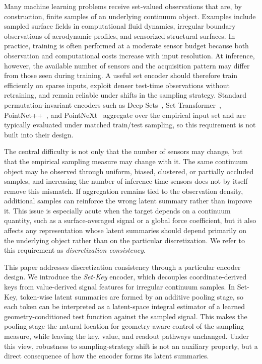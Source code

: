 \documentclass[11pt]{article}
\begin{document}
Many machine learning problems receive set-valued observations that are, by
construction, finite samples of an underlying continuum object.  Examples
include sampled surface fields in computational fluid dynamics, irregular
boundary observations of aerodynamic profiles, and sensorized structural
surfaces.  In practice, training is often performed at a moderate sensor budget
because both observation and computational costs increase with input
resolution.  At
inference, however, the available number of sensors and the acquisition pattern
may differ from those seen during training.  A useful set encoder should
therefore train efficiently on sparse inputs, exploit denser test-time
observations without retraining, and remain reliable under shifts in the
sampling strategy.  Standard permutation-invariant encoders such as Deep
Sets~\cite{zaheer2017deep}, Set Transformer~\cite{lee2019set}, PointNet++~\cite{qi2017pointnetpp},
and PointNeXt~\cite{qian2022pointnext} aggregate over the empirical input set
and are typically evaluated under matched train/test sampling, so this
requirement is not built into their design.

The central difficulty is not only that the number of sensors may change, but
that the empirical sampling measure may change with it.  The same continuum
object may be observed through uniform, biased, clustered, or partially
occluded samples, and increasing the number of inference-time sensors does not
by itself remove this mismatch.  If aggregation remains tied to the observation
density, additional samples can reinforce the wrong latent summary rather than
improve it.  This issue is especially acute when the target depends on a
continuum quantity, such as a surface-averaged signal or a global force
coefficient, but it also affects any representation whose latent summaries
should depend primarily on the underlying object rather than on the particular
discretization.  We refer to this requirement as \emph{discretization
consistency}.

This paper addresses discretization consistency through a particular encoder
design.  We introduce the \emph{Set-Key} encoder, which decouples
coordinate-derived keys from value-derived signal features for irregular
continuum samples.  In Set-Key, token-wise latent summaries are
formed by an additive pooling stage, so each token can be interpreted as a
latent-space integral estimator of a learned geometry-conditioned test function
against the sampled signal.  This makes the pooling stage the natural location
for geometry-aware control of the sampling measure, while leaving the key,
value, and readout pathways unchanged.  Under this view, robustness to
sampling-strategy shift is not an auxiliary property, but a direct consequence
of how the encoder forms its latent summaries.
\end{document}
